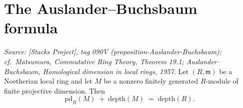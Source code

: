 \section{The Auslander--Buchsbaum formula}
\label{sec:ab_main}

\begin{theorem}\leanok
  \label{thm:auslander_buchsbaum}
  
  \textit{Source: [Stacks Project], tag 090V (proposition-Auslander-Buchsbaum); cf.\
  Matsumura, \emph{Commutative Ring Theory}, Theorem 19.1; Auslander--Buchsbaum,
  \emph{Homological dimension in local rings}, 1957.}
  Let \((R, \mathfrak{m})\) be a Noetherian local ring and let \(M\) be a nonzero finitely
  generated \(R\)-module of finite projective dimension. Then
  \[
    \text{pd}_R(M) \;+\; \text{depth}(M) \;=\; \text{depth}(R).
  \]
\end{theorem}

